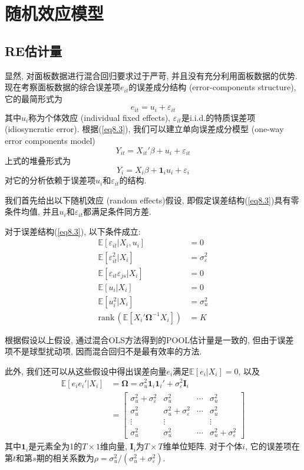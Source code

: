 \documentclass[cn, 12pt, math=mtpro2, bibstyle=apa, blue, twocol]{elegantbook}
\newcommand{\E}{\mathbb{E}}
\newcommand{\BO}{\mathbold{\Omega}}
\begin{document}
\section{随机效应模型}
\subsection{RE估计量}
显然, 对面板数据进行混合回归要求过于严苛, 并且没有充分利用面板数据的优势. 现在考察面板数据的综合误差项$e_{it}$的误差成分结构 (error-components structure), 它的最简形式为
\begin{equation}\label{eq8.3}
  e_{it}=u_i+\varepsilon_{it}
\end{equation}
其中$u_i$称为个体效应 (individual fixed effects), $\varepsilon_{it}$是i.i.d.的特质误差项 (idiosyncratic error). 根据(\ref{eq8.3}), 我们可以建立单向误差成分模型  (one-way error components model)
\begin{equation}\label{eq8.10}
  Y_{it}=X_{it}'\beta+u_i+\varepsilon_{it}
\end{equation}
上式的堆叠形式为
$$Y_i=X_i\beta+\mathbf{1}_iu_i+\varepsilon_i$$
对它的分析依赖于误差项$u_i$和$\varepsilon_{it}$的结构.

我们首先给出以下随机效应 (random effects)假设, 即假定误差结构(\ref{eq8.3})具有零条件均值, 并且$u_i$和$\varepsilon_{it}$都满足条件同方差.
\begin{proposition}\label{pro:pro8.1}
对于误差结构(\ref{eq8.3}), 以下条件成立:
\begin{align}
\E[\varepsilon_{it}|X_i,u_i]&=0 \label{eq8.4} \\
\E[\varepsilon_{it}^2|X_i]&=\sigma_\varepsilon^2 \label{eq8.5} \\
\E[\varepsilon_{it}\varepsilon_{js}|X_i]&=0 \label{eq8.6} \\
\E[u_i|X_i]&=0 \label{eq8.7} \\
\E[u_i^2|X_i]&=\sigma^2_u \label{eq8.8} \\
\text{rank}\,(\E[X_i'\BO^{-1}X_i])&=K
\end{align}
\end{proposition}
根据假设以上假设, 通过混合OLS方法得到的POOL估计量是一致的, 但由于误差项不是球型扰动项, 因而混合回归不是最有效率的方法.

此外, 我们还可以从这些假设中得出误差向量$e_i$满足$\E[e_i|X_i]=0$, 以及
\begin{align}
\E[e_ie_i'|X_i]&=\BO=\sigma_u^2\mathbf{1}_i\mathbf{1}_i'+\sigma_\varepsilon^2\mathbold{I}_i \nonumber \\
&=\begin{bmatrix}
   \sigma_u^2+\sigma_\varepsilon^2 & \sigma_u^2 & \cdots & \sigma_u^2 \\
   \sigma_u^2 & \sigma_u^2+\sigma_\varepsilon^2 & \cdots & \sigma_u^2 \\
   \vdots & \vdots &  & \vdots \\
   \sigma_u^2 & \sigma_u^2 & \cdots & \sigma_u^2+\sigma_\varepsilon^2
 \end{bmatrix} \label{eq8.14}
\end{align}
其中$\mathbf{1}_i$是元素全为1的$T\times1$维向量, $\mathbold{I}_i$为$T\times T$维单位矩阵. 对于个体$i$, 它的误差项在第$t$和第$s$期的相关系数为$\rho=\sigma_u^2/(\sigma_u^2+\sigma_\varepsilon^2)$.
\end{document}
